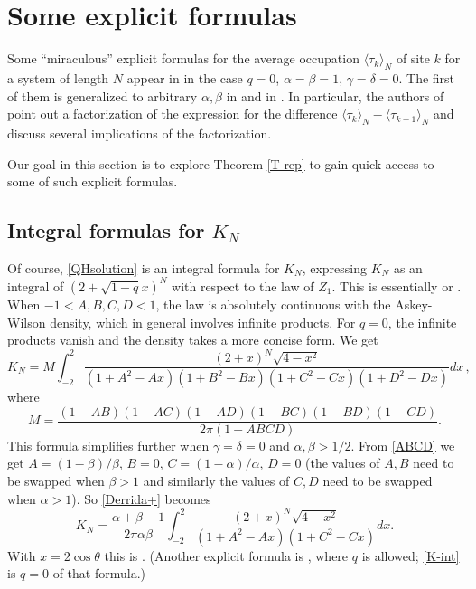 \documentclass{amsart}
\theoremstyle{definition}
\theoremstyle{remark}
\theoremstyle{remark}
\theoremstyle{definition}
\numberwithin{equation}{section}
\begin{document}
\section{Some explicit formulas}
 Some ``miraculous'' explicit formulas for the average occupation $\langle \tau_k\rangle_N $ of site $k$ for a system of length $N$ appear in \cite[Formulas (47) and (48)]{derrida1992exact} in the case $q=0$, $\alpha=\beta=1$, $\gamma=\delta=0$.
The first of them is generalized to arbitrary $\alpha,\beta$ in \cite[expressions (39) and (43)]{derrida1993exact} and in \cite{schutz1993phase}.
In particular, the authors of \cite[formula (3.3)]{schutz1993phase} point out a factorization of the expression for the difference $ {\langle}\tau_{k}{\rangle}_N-{\langle}\tau_{k+1}{\rangle}_N$ and
 discuss several implications of the factorization.

 Our goal in this section  is to explore Theorem \ref{T-rep} to gain quick access to some of such explicit formulas.

\subsection{Integral formulas for $K_N$}
Of course, \eqref{QHsolution} is an integral formula for $K_N$, expressing $K_N$
 as an integral of $(2+\sqrt{1-q}x)^N$ with respect to the law of $Z_1$.
  This is essentially   \cite[expression (6.1)]{uchiyama2004asymmetric} or \cite[expression (3.12)]{uchiyama2005correlation}.
 When $-1<A,B,C,D<1$,
 the law is absolutely continuous with the Askey-Wilson density, which in general involves infinite products. For $q=0$, the infinite products vanish and the density takes a more  concise form. We get
\begin{equation}
  \label{Derrida+}
  K_N= M\int_{-2}^2 \frac{(2+x)^N \sqrt{4-x^2}}{(1+A^2-Ax)(1+B^2-Bx)(1+C^2-Cx)(1+D^2-Dx)}  dx\,,
\end{equation}
where
$$
M=\frac{(1-AB)(1-AC)(1-AD)(1-BC)(1-BD)(1-CD)}{2\pi(1-ABCD)}.$$
This formula simplifies further when  $\gamma=\delta=0$  and $\alpha,\beta>1/2$. From \eqref{ABCD} we get
$A=(1-\beta)/\beta$, $B=0$,  $C=(1-\alpha)/\alpha$, $D=0$ (the values of $A,B$ need to be swapped when $\beta>1$ and similarly the values of $C,D$ need to be swapped when $\alpha>1$). So \eqref{Derrida+} becomes
\begin{equation}
  \label{K-int}
  K_N=\frac{\alpha+\beta-1}{2\pi \alpha\beta}\int_{-2}^2 \frac{(2+x)^N \sqrt{4-x^2}}{(1+A^2-Ax) (1+C^2-Cx) }  dx.
\end{equation}
  With $x=2\cos\theta$  this is \cite[expression (B10)]{derrida1993exact}. (Another explicit formula is \cite[formula (42)]{blythe2000exact}, where $q$ is allowed; \eqref{K-int} is $q=0$ of that formula.)
\end{document}
